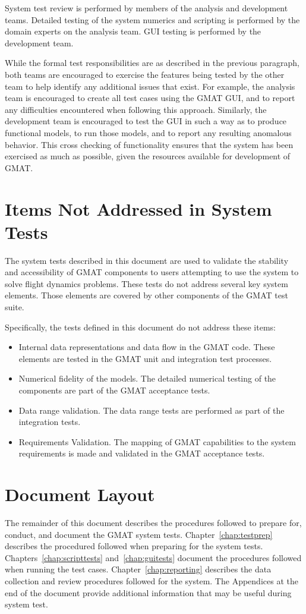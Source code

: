 System test review is performed by members of the analysis and development teams.  Detailed testing
of the system numerics and scripting is performed by the domain experts on the analysis team.  GUI
testing is performed by the development team.

While the formal test responsibilities are as described in the previous paragraph, both teams are
encouraged to exercise the features being tested by the other team to help identify any additional
issues that exist.  For example, the analysis team is encouraged to create all test cases using the
GMAT GUI, and to report any difficulties encountered when following this approach.  Similarly, the
development team is encouraged to test the GUI in such a way as to produce functional models, to
run those models, and to report any resulting anomalous behavior.  This cross checking of
functionality ensures that the system has been exercised as much as possible, given the resources
available for development of GMAT.

\section{Items Not Addressed in System Tests}

The system tests described in this document are used to validate the stability and accessibility of
GMAT components to users attempting to use the system to solve flight dynamics problems.  These
tests do not address several key system elements.  Those elements are covered by other components of
the GMAT test suite.

Specifically, the tests defined in this document do not address these items:

\begin{itemize}
\item Internal data representations and data flow in the GMAT code.  These elements are tested in
the GMAT unit and integration test processes.
\item Numerical fidelity of the models.  The detailed numerical testing of the components are part
of the GMAT acceptance tests.
\item Data range validation.  The data range tests are performed as part of the integration tests.
\item Requirements Validation.  The mapping of GMAT capabilities to the system requirements is made
and validated in the GMAT acceptance tests.
\end{itemize}

\section{Document Layout}

The remainder of this document describes the procedures followed to prepare for, conduct, and
document the GMAT system tests.  Chapter~\ref{chap:testprep} describes the procedured followed
when preparing for the system tests.  Chapters~\ref{chap:scripttests} and~\ref{chap:guitests}
document the procedures followed when running the test cases.  Chapter~\ref{chap:reporting}
describes the data collection and review procedures followed for the system.  The Appendices at the
end of the document provide additional information that may be useful during system test.
